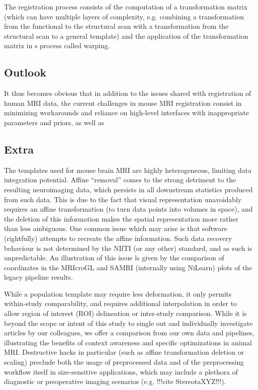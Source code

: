 The registration process consists of the computation of a transformation matrix (which can have multiple layers of complexity, e.g. combining a transformation from the functional to the structural scan with a transformation from the structural scan to a general template) and the application of the transformation matrix in s process called warping.

\subsection{Outlook}
It thus becomes obvious that in addition to the issues shared with registration of human MRI data, the current challenges in mouse MRI registration consist in minimizing workarounds and reliance on high-level interfaces with inappropriate parameters and priors, as well as 

	\subsection{Extra}
	The templates used for mouse brain MRI are highly heterogeneous, limiting data integration potential.
	Affine “removal” comes to the strong detriment to the resulting neuroimaging data, which persists in all downstream statistics produced from such data.
	This is due to the fact that visual representation unavoidably requires an affine transformation (to turn data points into volumes in space), and the deletion of this information makes the spatial representation more rather than less ambiguous.
	One common issue which may arise is that software (rightfully) attempts to recreate the affine information.
	Such data recovery behaviour is not determined by the NIfTI (or any other) standard, and as such is unpredictable.
	An illustration of this issue ls given by the comparison of coordinates in the MRIcroGL and SAMRI (internally using NiLearn) plots of the legacy pipeline results.
	
	While a population template may require less deformation, it only permits within-study comparability, and requires additional interpolation in order to allow region of interest (ROI) delineation or inter-study comparison.
	While it is beyond the scope or intent of this study to single out and individually investigate articles by our colleagues, we offer a comparison from our own data and pipelines, illustrating the benefits of context awareness and specific optimizations in animal MRI.
	Destructive hacks in particular (such as affine transformation deletion or scaling) preclude both the usage of preprocessed data and of the preprocessing workflow itself in size-sensitive applications, which may include a plethora of diagnostic or preoperative imaging scenarios (e.g. !!!cite StereotaXYZ!!!).
	
